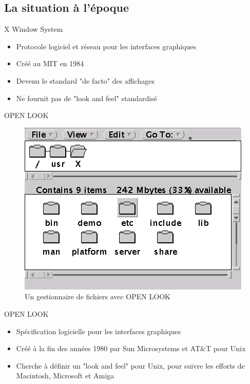 \documentclass{beamer}
\begin{document}
  \subsection{La situation à l'époque}
  \begin{frame}{X Window System}
    \begin{itemize}
      \item Protocole logiciel et réseau pour les interfaces graphiques\\
      \item Créé au MIT en 1984\\
      \item Devenu le standard "de facto" des affichages\\
      \item Ne fournit pas de "look and feel" standardisé
    \end{itemize}
  \end{frame}
  \begin{frame}{OPEN LOOK}
    \begin{figure}[htb]
    \centering
    \includegraphics[scale=0.5]{"openlook"}
    \caption{Un gestionnaire de fichiers avec OPEN LOOK}
    \label{fig:openlook}
    \end{figure}
  \end{frame}
  \begin{frame}{OPEN LOOK}
    \begin{itemize}
      \item Spécification logicielle pour les interfaces graphiques\\
      \item Créé à la fin des années 1980 par Sun Microsystems et AT\&T pour Unix\\
      \item Cherche à définir un "look and feel" pour Unix, pour suivre les efforts de Macintosh, Microsoft et Amiga
    \end{itemize}
  \end{frame}
\end{document}
